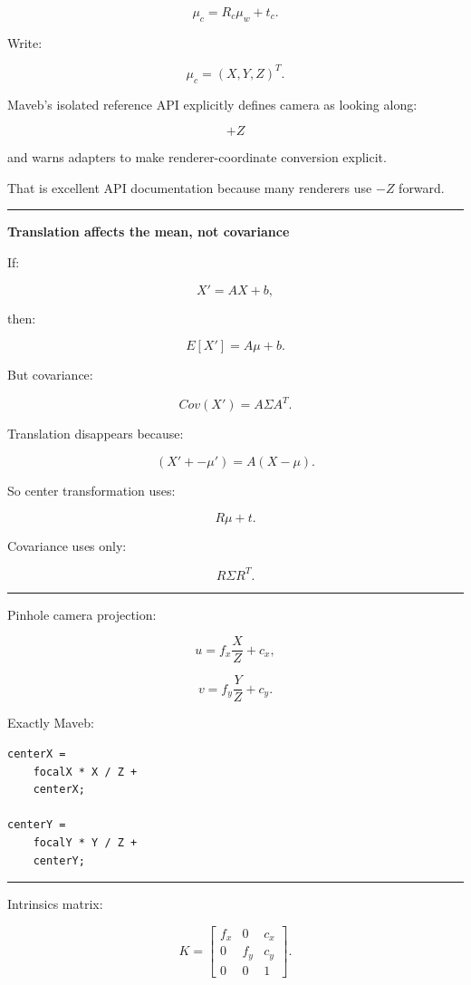 \[
\boxed{
\mu_c
=
R_c\mu_w+t_c.
}
\]

Write:

\[
\mu_c=
(X,Y,Z)^T.
\]

Maveb's isolated reference API explicitly defines camera as looking along:

\[
\boxed{+Z}
\]

and warns adapters to make renderer-coordinate conversion explicit.

That is excellent API documentation because many renderers use \(-Z\) forward.

\begin{center}\rule{0.5\linewidth}{0.5pt}\end{center}

\textbf{Translation affects the mean, not covariance}

If:

\[
X'=AX+b,
\]

then:

\[
E[X']
=
A\mu+b.
\]

But covariance:

\[
Cov(X')
=
A\Sigma A^T.
\]

Translation disappears because:

\[
(X'+-\mu')
=
A(X-\mu).
\]

So center transformation uses:

\[
R\mu+t.
\]

Covariance uses only:

\[
R\Sigma R^T.
\]

\begin{center}\rule{0.5\linewidth}{0.5pt}\end{center}

Pinhole camera projection:

\[
u=
f_x\frac{X}{Z}
+
c_x,
\]

\[
v=
f_y\frac{Y}{Z}
+
c_y.
\]

Exactly Maveb:

\begin{verbatim}
centerX =
    focalX * X / Z +
    centerX;

centerY =
    focalY * Y / Z +
    centerY;
\end{verbatim}

\begin{center}\rule{0.5\linewidth}{0.5pt}\end{center}

Intrinsics matrix:

\[
\boxed{
K=
\begin{bmatrix}
f_x&0&c_x\\
0&f_y&c_y\\
0&0&1
\end{bmatrix}.
}
\]

